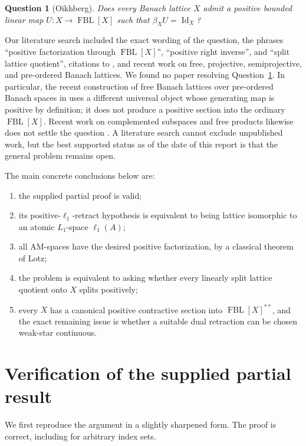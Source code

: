 \documentclass[11pt]{article}
\newtheorem{question}[theorem]{Question}
\newcommand{\FBL}{\operatorname{FBL}}
\newcommand{\Id}{\operatorname{Id}}
\begin{document}
\begin{question}[Oikhberg]\label{q:main}
Does every Banach lattice $X$ admit a positive bounded linear map
$U:X\to\FBL[X]$ such that $\beta_XU=\Id_X$?
\end{question}

Our literature search included the exact wording of the question, the phrases
``positive factorization through $\FBL[X]$'', ``positive right inverse'', and
``split lattice quotient'', citations to \cite{Oikhberg2024}, and recent work
on free, projective, semiprojective, and pre-ordered Banach lattices.  We found
no paper resolving Question~\ref{q:main}.  In particular, the recent construction of
free Banach lattices over pre-ordered Banach spaces in \cite{deJeuJiang2026}
uses a different universal object whose generating map is positive by
definition; it does not produce a positive section into the ordinary
$\FBL[X]$.  Recent work on complemented subspaces and free products likewise
does not settle the question \cite{deHeviaTradacete2025,MartinezTradacete2026}.
A literature search cannot exclude unpublished work, but the best supported
status as of the date of this report is that the general problem remains open.

The main concrete conclusions below are:
\begin{enumerate}[label=(\roman*),leftmargin=2.2em]
\item the supplied partial proof is valid;
\item its positive-$\ell_1$-retract hypothesis is equivalent to being lattice
isomorphic to an atomic $L_1$-space $\ell_1(A)$;
\item all AM-spaces have the desired positive factorization, by a classical
theorem of Lotz;
\item the problem is equivalent to asking whether every linearly split lattice
quotient onto $X$ splits positively;
\item every $X$ has a canonical positive contractive section into
$\FBL[X]^{**}$, and the exact remaining issue is whether a suitable dual
retraction can be chosen weak-star continuous.
\end{enumerate}

\section{Verification of the supplied partial result}

We first reproduce the argument in a slightly sharpened form.  The proof is
correct, including for arbitrary index sets.
\end{document}
